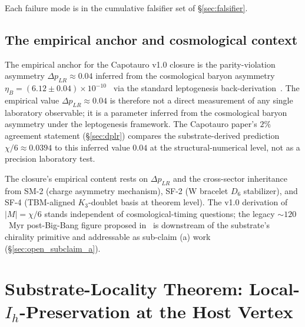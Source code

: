 \documentclass[11pt,letterpaper]{article}
\newcommand{\Kthree}{\ensuremath{K_3}}
\newcommand{\DeltapLR}{\Delta p_{LR}}
\newcommand{\Dsix}{D_6}
\begin{document}
Each failure mode is in the cumulative falsifier set of \S\ref{sec:falsifier}.

\subsection{The empirical anchor and cosmological context}\label{sec:empirical_anchor}

The empirical anchor for the Capotauro v1.0 closure is the parity-violation asymmetry $\DeltapLR \approx 0.04$ inferred from the cosmological baryon asymmetry $\eta_B = (6.12 \pm 0.04) \times 10^{-10}$~\cite{planck_2018} via the standard leptogenesis back-derivation~\cite{abshier_grok_capotauro_2025}. The empirical value $\DeltapLR \approx 0.04$ is therefore not a direct measurement of any single laboratory observable; it is a parameter inferred from the cosmological baryon asymmetry under the leptogenesis framework. The Capotauro paper's $2\%$ agreement statement (\S\ref{sec:dplr}) compares the substrate-derived prediction $\chi/6 \approx 0.0394$ to this inferred value $0.04$ at the structural-numerical level, not as a precision laboratory test.

The closure's empirical content rests on $\DeltapLR$ and the cross-sector inheritance from SM-2 (charge asymmetry mechanism), SF-2 (W bracelet $\Dsix$ stabilizer), and SF-4 (TBM-aligned $\Kthree$-doublet basis at theorem level). The v1.0 derivation of $|M| = \chi/6$ stands independent of cosmological-timing questions; the legacy $\sim 120$~Myr post-Big-Bang figure proposed in~\cite{abshier_grok_capotauro_2025} is downstream of the substrate's chirality primitive and addressable as sub-claim (a) work (\S\ref{sec:open_subclaim_a}).

\section{Substrate-Locality Theorem: Local-$I_h$-Preservation at the Host Vertex}\label{sec:substrate_locality}
\end{document}
